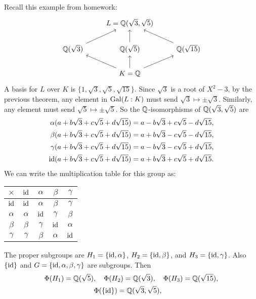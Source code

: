 \begin{example}
  Recall this example from homework:
  \[
  \begin{tikzcd}
    & L = \Q(\sqrt{3}, \sqrt{5}) \\
    \Q(\sqrt{3}) \urar & \Q(\sqrt{5}) \uar & \Q(\sqrt{15}) \ular \\
    & K = \Q \ular \uar \urar
  \end{tikzcd}
  \]
  A basis for $L$ over $K$ is $\{1, \sqrt{3}, \sqrt{5}, \sqrt{15}\}$.
  Since $\sqrt{3}$ is a root of $X^2 - 3$,
  by the previous theorem, any element in $\operatorname{Gal}(L : K)$
  must send $\sqrt{3} \mapsto \pm \sqrt{3}$. Similarly,
  any element must send
  $\sqrt{5} \mapsto \pm \sqrt{5}$. So
  the $\mathbb{Q}$-isomorphisms of $\mathbb{Q}(\sqrt{3}, \sqrt{5})$
  are
  \begin{align*}
    \alpha(a + b\sqrt{3} + c\sqrt{5} + d\sqrt{15})
    &= a - b\sqrt{3} + c\sqrt{5} - d\sqrt{15}, \\
    \beta(a + b\sqrt{3} + c\sqrt{5} + d\sqrt{15})
    &= a + b\sqrt{3} - c\sqrt{5} - d\sqrt{15}, \\
    \gamma(a + b\sqrt{3} + c\sqrt{5} + d\sqrt{15})
    &= a - b\sqrt{3} - c\sqrt{5} + d\sqrt{15}, \\
    \mathrm{id}(a + b\sqrt{3} + c\sqrt{5} + d\sqrt{15})
    &= a + b\sqrt{3} + c\sqrt{5} + d\sqrt{15}.
  \end{align*}
  We can write the multiplication table for this
  group as:
  \begin{center}
    \begin{tabular}{c|cccc}
      $\times$ & $\mathrm{id}$ & $\alpha$ & $\beta$ & $\gamma$ \\
      \hline
      $\mathrm{id}$ & $\mathrm{id}$ & $\alpha$ & $\beta$ & $\gamma$ \\
      $\alpha$ & $\alpha$ & $\mathrm{id}$ & $\gamma$ & $\beta$ \\
      $\beta$ & $\beta$ & $\gamma$ & $\mathrm{id}$ & $\alpha$ \\
      $\gamma$ & $\gamma$ & $\beta$ & $\alpha$ & $\mathrm{id}$
    \end{tabular}
  \end{center}
  The proper subgroups are
  $H_1 = \{\mathrm{id}, \alpha\}$, $H_2 = \{\mathrm{id}, \beta\}$, and
  $H_3 = \{\mathrm{id}, \gamma\}$. Also
  $\{\mathrm{id}\}$ and $G = \{\mathrm{id}, \alpha, \beta, \gamma\}$
  are subgroups. Then
  \begin{gather*}
    \Phi(H_1) = \Q(\sqrt{5}), \quad
    \Phi(H_2) = \Q(\sqrt{3}), \quad
    \Phi(H_3) = \Q(\sqrt{15}), \\
    \Phi(\{\id\}) = \Q(\sqrt{3}, \sqrt{5}), \quad

\end{gather*}
\end{example}
